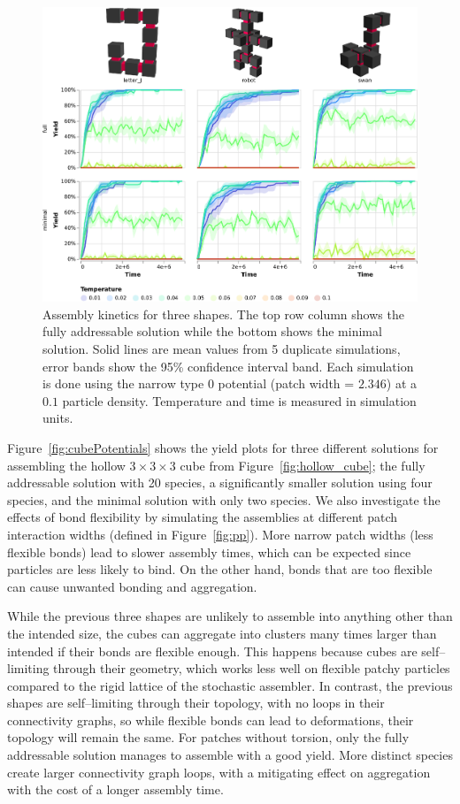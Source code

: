 \begin{figure}[h]
    \centering
    \includegraphics[width=\linewidth]{figures/patchysim/shapeKinetics.eps}
    \caption{Assembly kinetics for three shapes. The top row column shows the fully addressable solution while the bottom shows the minimal solution. Solid lines are mean values from 5 duplicate simulations, error bands show the 95\% confidence interval band. Each simulation is done using the narrow type \(0\) potential (patch width = \(2.346\)) at a \(0.1\) particle density. Temperature and time is measured in simulation units.}
    \label{fig:shapeKinetics}
\end{figure}

Figure~\ref{fig:cubePotentials} shows the yield plots for three different solutions for assembling the hollow \(3 \times 3 \times 3\) cube from Figure~\ref{fig:hollow_cube}; the fully addressable solution with 20 species, a significantly smaller solution using four species, and the minimal solution with only two species. We also investigate the effects of bond flexibility by simulating the assemblies at different patch interaction widths (defined in Figure~\ref{fig:pp}). More narrow patch widths (less flexible bonds) lead to slower assembly times, which can be expected since particles are less likely to bind. On the other hand, bonds that are too flexible can cause unwanted bonding and aggregation.

While the previous three shapes are unlikely to assemble into anything other than the intended size, the cubes can aggregate into clusters many times larger than intended if their bonds are flexible enough. This happens because cubes are self--limiting through their geometry, which works less well on flexible patchy particles compared to the rigid lattice of the stochastic assembler. In contrast, the previous shapes are self--limiting through their topology, with no loops in their connectivity graphs, so while flexible bonds can lead to deformations, their topology will remain the same. For patches without torsion, only the fully addressable solution manages to assemble with a good yield. More distinct species create larger connectivity graph loops, with a mitigating effect on aggregation with the cost of a longer assembly time. 

